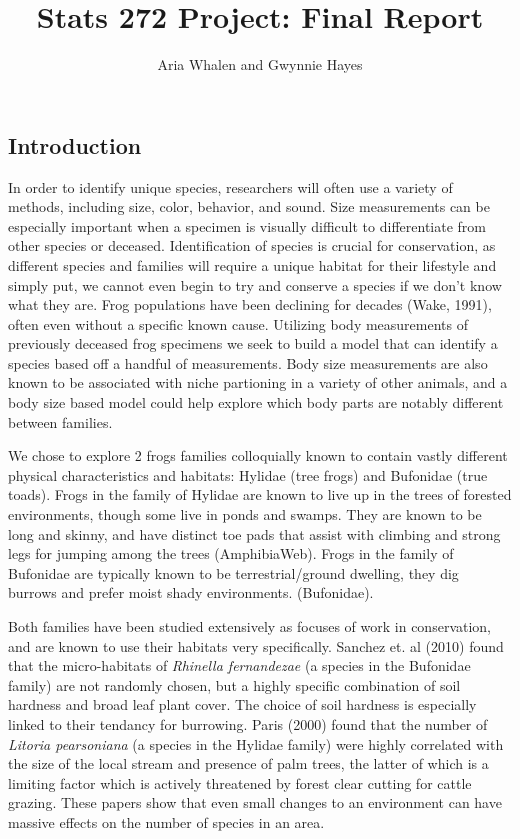 \documentclass[
]{article}
\title{Stats 272 Project: Final Report}
\author{Aria Whalen and Gwynnie Hayes}
\date{}
\begin{document}
\maketitle

\subsection{Introduction}\label{introduction}

In order to identify unique species, researchers will often use a
variety of methods, including size, color, behavior, and sound. Size
measurements can be especially important when a specimen is visually
difficult to differentiate from other species or deceased.
Identification of species is crucial for conservation, as different
species and families will require a unique habitat for their lifestyle
and simply put, we cannot even begin to try and conserve a species if we
don't know what they are. Frog populations have been declining for
decades (Wake, 1991), often even without a specific known cause.
Utilizing body measurements of previously deceased frog specimens we
seek to build a model that can identify a species based off a handful of
measurements. Body size measurements are also known to be associated
with niche partioning in a variety of other animals, and a body size
based model could help explore which body parts are notably different
between families.

We chose to explore 2 frogs families colloquially known to contain
vastly different physical characteristics and habitats: Hylidae (tree
frogs) and Bufonidae (true toads). Frogs in the family of Hylidae are
known to live up in the trees of forested environments, though some live
in ponds and swamps. They are known to be long and skinny, and have
distinct toe pads that assist with climbing and strong legs for jumping
among the trees (AmphibiaWeb). Frogs in the family of Bufonidae are
typically known to be terrestrial/ground dwelling, they dig burrows and
prefer moist shady environments. (Bufonidae).

Both families have been studied extensively as focuses of work in
conservation, and are known to use their habitats very specifically.
Sanchez et. al (2010) found that the micro-habitats of \emph{Rhinella
fernandezae} (a species in the Bufonidae family) are not randomly
chosen, but a highly specific combination of soil hardness and broad
leaf plant cover. The choice of soil hardness is especially linked to
their tendancy for burrowing. Paris (2000) found that the number of
\emph{Litoria pearsoniana} (a species in the Hylidae family) were highly
correlated with the size of the local stream and presence of palm trees,
the latter of which is a limiting factor which is actively threatened by
forest clear cutting for cattle grazing. These papers show that even
small changes to an environment can have massive effects on the number
of species in an area.
\end{document}

